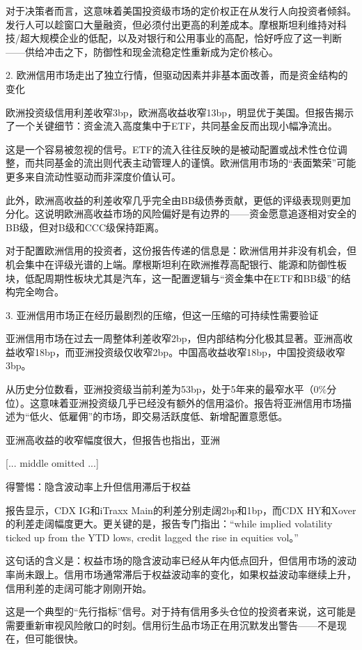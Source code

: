 \documentclass[11pt]{ctexart}
\begin{document}
对于决策者而言，这意味着美国投资级市场的定价权正在从发行人向投资者倾斜。发行人可以趁窗口大量融资，但必须付出更高的利差成本。摩根斯坦利维持对科技/超大规模企业的低配，以及对银行和公用事业的高配，恰好呼应了这一判断——供给冲击之下，防御性和现金流稳定性重新成为定价核心。

2. 欧洲信用市场走出了独立行情，但驱动因素并非基本面改善，而是资金结构的变化

欧洲投资级信用利差收窄3bp，欧洲高收益收窄13bp，明显优于美国。但报告揭示了一个关键细节：资金流入高度集中于ETF，共同基金反而出现小幅净流出。

这是一个容易被忽视的信号。ETF的流入往往反映的是被动配置或战术性仓位调整，而共同基金的流出则代表主动管理人的谨慎。欧洲信用市场的“表面繁荣”可能更多来自流动性驱动而非深度价值认可。

此外，欧洲高收益的利差收窄几乎完全由BB级债券贡献，更低的评级表现则更加分化。这说明欧洲高收益市场的风险偏好是有边界的——资金愿意追逐相对安全的BB级，但对B级和CCC级保持距离。

对于配置欧洲信用的投资者，这份报告传递的信息是：欧洲信用并非没有机会，但机会集中在评级光谱的上端。摩根斯坦利在欧洲推荐高配银行、能源和防御性板块，低配周期性板块尤其是汽车，这一配置逻辑与“资金集中在ETF和BB级”的结构完全吻合。

3. 亚洲信用市场正在经历最剧烈的压缩，但这一压缩的可持续性需要验证

亚洲信用市场在过去一周整体利差收窄2bp，但内部结构分化极其显著。亚洲高收益收窄18bp，而亚洲投资级仅收窄2bp。中国高收益收窄18bp，中国投资级收窄3bp。

从历史分位数看，亚洲投资级当前利差为53bp，处于5年来的最窄水平（0\%分位）。这意味着亚洲投资级几乎已经没有额外的信用溢价。报告将亚洲信用市场描述为“低火、低雇佣”的市场，即交易活跃度低、新增配置意愿低。

亚洲高收益的收窄幅度很大，但报告也指出，亚洲

[... middle omitted ...]

得警惕：隐含波动率上升但信用滞后于权益

报告显示，CDX IG和iTraxx Main的利差分别走阔2bp和1bp，而CDX HY和Xover的利差走阔幅度更大。更关键的是，报告专门指出：“while implied volatility ticked up from the YTD lows, credit lagged the rise in equities vol。”

这句话的含义是：权益市场的隐含波动率已经从年内低点回升，但信用市场的波动率尚未跟上。信用市场通常滞后于权益波动率的变化，如果权益波动率继续上升，信用利差的走阔可能才刚刚开始。

这是一个典型的“先行指标”信号。对于持有信用多头仓位的投资者来说，这可能是需要重新审视风险敞口的时刻。信用衍生品市场正在用沉默发出警告——不是现在，但可能很快。
\end{document}
